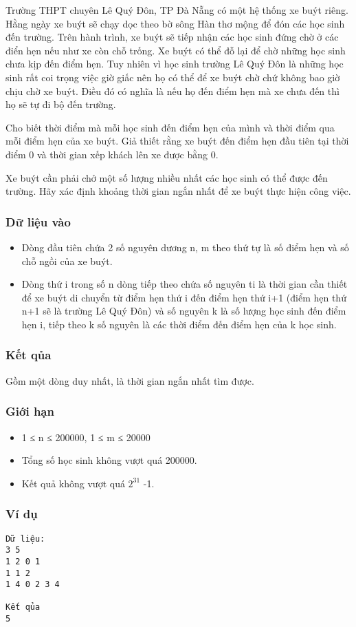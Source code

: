 



   Trường THPT chuyên Lê Quý Đôn, TP Đà Nẵng có một hệ thống xe buýt riêng. Hằng ngày xe buýt sẽ chạy dọc theo bờ sông Hàn thơ mộng để đón các học sinh đến trường. Trên hành trình, xe buýt sẽ   tiếp nhận các học sinh đứng chờ ở các điển hẹn nếu như xe còn chỗ trống. Xe buýt có thể đỗ lại để chờ những học sinh chưa kịp đến điểm hẹn. Tuy nhiên vì học sinh trường Lê Quý Đôn là những học sinh rất   coi trọng việc giờ giấc nên họ có thể để xe buýt chờ chứ không bao giờ chịu chờ xe buýt. Điều đó có nghĩa là nếu họ đến điểm hẹn mà xe chưa đến thì họ sẽ tự đi bộ đến trường.  

   Cho biết thời điểm mà mỗi học sinh đến điểm hẹn của mình và thời điểm qua mỗi điểm hẹn của xe buýt. Giả thiết rằng xe buýt đến điểm hẹn đầu tiên tại thời điểm 0 và thời gian xếp khách lên xe được bằng   0.  

   Xe buýt cần phải chở một số lượng nhiều nhất các học sinh có thể được đến trường. Hãy xác định khoảng thời gian ngắn nhất để xe buýt thực hiện công việc.  

\subsubsection{   Dữ liệu vào  }
\begin{itemize}
	\item     Dòng đầu tiên chứa 2 số nguyên dương n, m theo thứ tự là số điểm hẹn và số chỗ ngồi của xe buýt.   
	\item     Dòng thứ i trong số n dòng tiếp theo chứa số nguyên ti là thời gian cần thiết để xe buýt di chuyển từ điểm hẹn thứ i đến điểm hẹn thứ i+1 (điểm hẹn thứ n+1 sẽ là trường Lê Quý Đôn) và số nguyên k là số   lượng học sinh đến điểm hẹn i, tiếp theo k số nguyên là các thời điểm đến điểm hẹn của k học sinh.   
\end{itemize}

\subsubsection{   Kết qủa  }

   Gồm một dòng duy nhất, là thời gian ngắn nhất tìm được.  

\subsubsection{   Giới hạn  }
\begin{itemize}
	\item     1 ≤ n ≤ 200000, 1 ≤ m ≤ 20000   
	\item     Tổng số học sinh không vượt quá 200000.   
	\item     Kết quả không vượt quá $2^{31}$    -1.   
\end{itemize}

\subsubsection{   Ví dụ  }
\begin{verbatim}
Dữ liệu:
3 5
1 2 0 1
1 1 2
1 4 0 2 3 4

Kết qủa
5
\end{verbatim}
